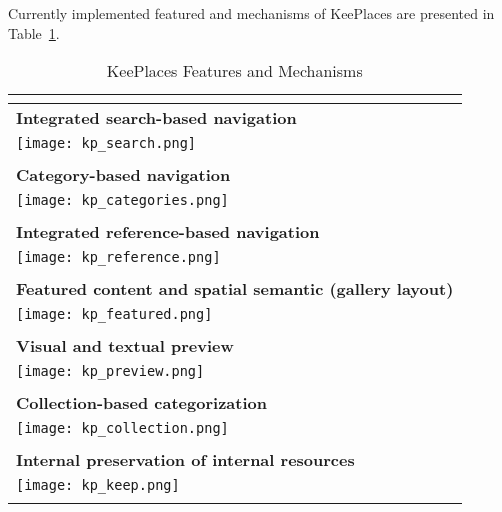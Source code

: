 \label{chapter:appendix_keeplaces}
Currently implemented featured and mechanisms of KeePlaces are presented in Table~\ref{table:keeplaces}.
\begin{longtable}{|p{0.90\linewidth}|}

\caption{KeePlaces Features and Mechanisms}\\
\label{table:keeplaces}\\
\hline
\textbf{Integrated search-based navigation}         \\
\texttt{[image: kp\_search.png]}\\
\\
\textbf{Category-based navigation}         \\
\texttt{[image: kp\_categories.png]}\\
\\

\textbf{Integrated reference-based navigation}         \\
\texttt{[image: kp\_reference.png]}\\
\\
\hline
\pagebreak
\hline
\textbf{Featured content and spatial semantic (gallery layout)}         \\
\texttt{[image: kp\_featured.png]}\\
\\

\textbf{Visual and textual preview}         \\
\texttt{[image: kp\_preview.png]}\\
\\
\hline
\pagebreak
\hline
\textbf{Collection-based categorization}         \\
\texttt{[image: kp\_collection.png]}\\
\\

\textbf{Internal preservation of internal resources}         \\
\texttt{[image: kp\_keep.png]}\\
\\

\hline
\end{longtable}
